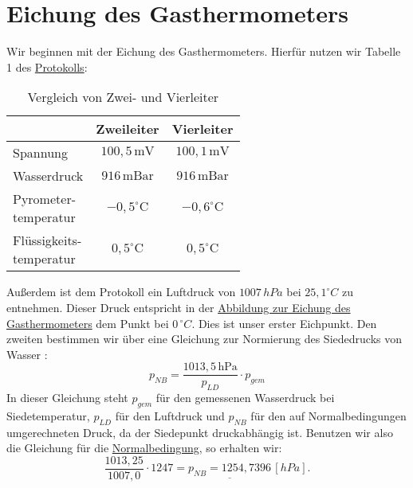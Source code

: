 \twocolumn

\section{Eichung des Gasthermometers}
Wir beginnen mit der Eichung des Gasthermometers. Hierfür nutzen wir Tabelle 1 des \hyperref[Protokoll]{Protokolls}:

\begin{table}[h!]
    \centering
    \caption{Vergleich von Zwei- und Vierleiter}
    \label{tab:zweileiter_vierleiter}
    \begin{tabular}{l | c | c}
        & \textbf{Zweileiter} & \textbf{Vierleiter} \\
        \hline
        Spannung & $100,5\,\text{mV}$ & $100,1\,\text{mV}$ \\
        \hline
        Wasserdruck & $916\,\text{mBar}$ & $916\,\text{mBar}$ \\
        \hline
        \parbox{2.5cm}{Pyrometer-\\temperatur} & $-0,5^\circ\text{C}$ & $-0,6^\circ\text{C}$ \\
        \hline
        \parbox{2.5cm}{Flüssigkeits-\\temperatur} & $0,5^\circ\text{C}$ & $0,5^\circ\text{C}$
    \end{tabular}
\end{table}

Außerdem ist dem Protokoll ein Luftdruck von $1007 \, hPa$ bei $25,1^\circ C$ zu entnehmen. Dieser Druck entspricht in der \hyperref[fig:graphisch_temp_druck]{Abbildung zur Eichung des Gasthermometers} dem Punkt bei $0 \, ^\circ C$.
Dies ist unser erster Eichpunkt. Den zweiten bestimmen wir über eine Gleichung zur Normierung des Siededrucks von Wasser \cite{skript25}:
\begin{equation}
    p_{NB} = \frac{1013,5\,\text{hPa}}{p_{LD}} \cdot p_{gem}
    \label{eq:normal_siedepunkt}
\end{equation}
In dieser Gleichung steht $p_{gem}$ für den gemessenen Wasserdruck bei Siedetemperatur, $p_{LD}$ für den Luftdruck und $p_{NB}$ für den auf Normalbedingungen umgerechneten Druck, da der Siedepunkt druckabhängig ist.
Benutzen wir also die Gleichung für die \hyperref[fig:graphisch_temp_druck]{Normalbedingung}, so erhalten wir:
\begin{equation}
    \frac{1013,25}{1007,0} \cdot 1247 = \underline{p_{NB} = 1254,7396} \, [hPa].
\end{equation}

